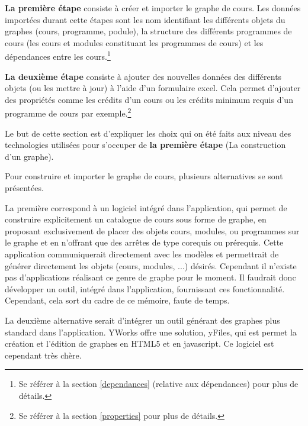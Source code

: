 \textbf{La première étape} consiste à créer et importer le graphe de cours. Les données importées durant cette étapes sont les nom identifiant les différents objets du graphes (cours, programme, podule), la structure des différents programmes de cours (les cours et modules constituant les programmes de cours) et les dépendances entre les cours.\footnote{Se référer à la section \ref{dependances} (relative aux dépendances) pour plus de détails.}

\textbf{La deuxième étape} consiste à ajouter des nouvelles données des différents objets (ou les mettre à jour) à l'aide d'un formulaire excel. Cela permet d'ajouter des propriétés comme les crédits d'un cours ou les crédits minimum requis d'un programme de cours par exemple.\footnote{Se référer à la section \ref{properties} pour plus de détails.} 

Le but de cette section est d'expliquer les choix qui on été faits aux niveau des technologies utilisées pour s'occuper de \textbf{la première étape} (La construction d'un graphe). 

Pour construire et importer le graphe de cours, plusieurs alternatives se sont présentées.

La première correspond à un logiciel intégré dans l'application, qui permet de construire explicitement un catalogue de cours sous forme de graphe, en proposant exclusivement de placer des objets cours, modules, ou programmes sur le graphe et en n'offrant que des arrêtes de type corequis ou prérequis. Cette application communiquerait directement avec les modèles et permettrait de générer directement les objets (cours, modules, ...) désirés. Cependant il n'existe pas d'applications réalisant ce genre de graphe pour le moment. Il faudrait donc développer un outil, intégré dans l'application,  fournissant ces fonctionnalité. Cependant, cela sort du cadre de ce mémoire, faute de temps. 

La deuxième alternative serait d'intégrer un outil générant des graphes plus standard dans l'application. YWorks offre une solution, yFiles, qui est permet la création et l'édition de graphes en HTML5 et en javascript. Ce logiciel est cependant très chère.

